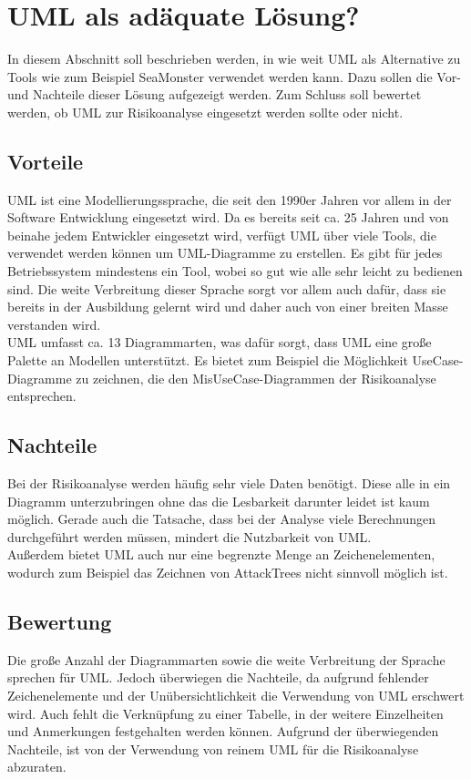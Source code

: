 \section{UML als adäquate Lösung?}
In diesem Abschnitt soll beschrieben werden, in wie weit UML als Alternative zu Tools wie zum Beispiel SeaMonster verwendet werden kann. Dazu sollen die Vor- und Nachteile dieser Lösung aufgezeigt werden. Zum Schluss soll bewertet werden, ob UML zur Risikoanalyse eingesetzt werden sollte oder nicht.

\subsection{Vorteile}
UML ist eine Modellierungssprache, die seit den 1990er Jahren vor allem in der Software Entwicklung eingesetzt wird. Da es bereits seit ca. 25 Jahren und von beinahe jedem Entwickler eingesetzt wird, verfügt UML über viele Tools, die verwendet werden können um UML-Diagramme zu erstellen. Es gibt für jedes Betriebssystem mindestens ein Tool, wobei so gut wie alle sehr leicht zu bedienen sind. Die weite Verbreitung dieser Sprache sorgt vor allem auch dafür, dass sie bereits in der Ausbildung gelernt wird und daher auch von einer breiten Masse verstanden wird.\\
UML umfasst ca. 13 Diagrammarten, was dafür sorgt, dass UML eine große Palette an Modellen unterstützt. Es bietet zum Beispiel die Möglichkeit UseCase-Diagramme zu zeichnen, die den MisUseCase-Diagrammen der Risikoanalyse entsprechen.

\subsection{Nachteile}
Bei der Risikoanalyse werden häufig sehr viele Daten benötigt. Diese alle in ein Diagramm unterzubringen ohne das die Lesbarkeit darunter leidet ist kaum möglich. Gerade auch die Tatsache, dass bei der Analyse viele Berechnungen durchgeführt werden müssen, mindert die Nutzbarkeit von UML.\\
Außerdem bietet UML auch nur eine begrenzte Menge an Zeichenelementen, wodurch zum Beispiel das Zeichnen von AttackTrees nicht sinnvoll möglich ist.

\subsection{Bewertung}
Die große Anzahl der Diagrammarten sowie die weite Verbreitung der Sprache sprechen für UML. Jedoch überwiegen die Nachteile, da aufgrund fehlender Zeichenelemente und der Unübersichtlichkeit die Verwendung von UML erschwert wird. Auch fehlt die Verknüpfung zu einer Tabelle, in der weitere Einzelheiten und Anmerkungen festgehalten werden können. Aufgrund der überwiegenden Nachteile, ist von der Verwendung von reinem UML für die Risikoanalyse abzuraten.